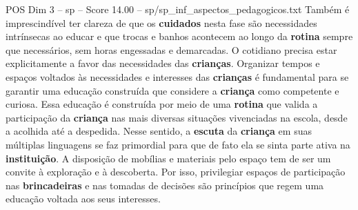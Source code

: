 \begin{textsample}{POS Dim 3 – sp – Score 14.00 – sp/sp\_inf\_aspectos\_pedagogicos.txt}
Também é imprescindível ter clareza de que os \textbf{cuidados} nesta fase são necessidades intrínsecas ao educar e que trocas e banhos acontecem ao longo da \textbf{rotina} sempre que necessários, sem horas engessadas e demarcadas.
O cotidiano precisa estar explicitamente a favor das necessidades das \textbf{crianças}.
Organizar tempos e espaços voltados às necessidades e interesses das \textbf{crianças} é fundamental para se garantir uma educação construída que considere a \textbf{criança} como competente e curiosa.
Essa educação é construída por meio de uma \textbf{rotina} que valida a participação da \textbf{criança} nas mais diversas situações vivenciadas na escola, desde a acolhida até a despedida.
Nesse sentido, a \textbf{escuta} da \textbf{criança} em suas múltiplas linguagens se faz primordial para que de fato ela se sinta parte ativa na \textbf{instituição}.
A disposição de mobílias e materiais pelo espaço tem de ser um convite à exploração e à descoberta.
Por isso, privilegiar espaços de participação nas \textbf{brincadeiras} e nas tomadas de decisões são princípios que regem uma educação voltada aos seus interesses.

\end{textsample}
